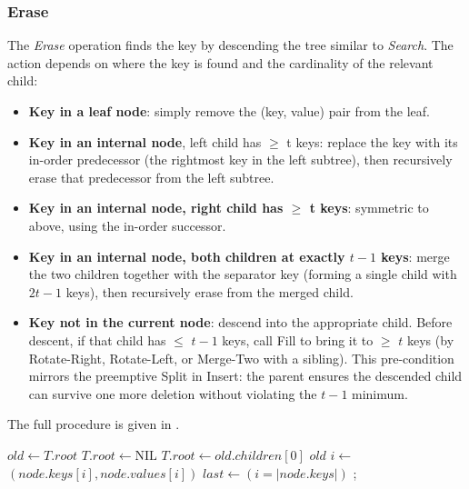 \documentclass[sigconf]{acmart}
\begin{document}
\subsubsection{Erase}
The \textit{Erase} operation finds the key by descending the tree similar to \textit{Search}. 
The action depends on where the key is found and the cardinality of the relevant child:
\begin{itemize}[noitemsep, topsep=0pt, parsep=0pt, partopsep=0pt]
    \item \textbf{Key in a leaf node}: simply remove the (key, value) pair from the leaf.
    \item \textbf{Key in an internal node}, left child has $\ge$ t keys: replace the key with its in-order predecessor (the rightmost key in the left subtree), then recursively erase that predecessor from the left subtree.
    \item \textbf{Key in an internal node, right child has $\ge$ t keys}: symmetric to above, using the in-order successor.
    \item \textbf{Key in an internal node, both children at exactly $t - 1$ keys}: merge the two children together with the separator key (forming a single child with $2t - 1$ keys), then recursively erase from the merged child.
    \item \textbf{Key not in the current node}: descend into the appropriate child. Before descent, if that child has $\le$ $t - 1$ keys, call Fill to bring it to $\ge$ $t$ keys (by Rotate-Right, Rotate-Left, or Merge-Two with a sibling). This pre-condition mirrors the preemptive Split in Insert: the parent ensures the descended child can survive one more deletion without violating the $t - 1$ minimum.
\end{itemize}
The full procedure is given in .

\begin{algorithm}[tbp]
\caption{B-Tree Erase Algorithm}
\label{alg:btree-erase}
\begin{algorithmic}[1]
     \State \Return \EndIf
    \State {}
        \State $old \gets T.root$
         \State $T.root \gets \text{NIL}$
        \Else \State $T.root \gets old.children[0]$
        \EndIf
        \State {} $old$
    \EndIf
\EndProcedure
\Statex
{}
    \State $i \gets$ 
            \State {} $(node.keys[i], node.values[i])$
        \Else
            \State {}
        \EndIf
        \State \Return
    \EndIf
     \State \Return \EndIf
    \State $last \gets (i = |node.keys|)$
        \State {}
    \EndIf
        \State {}; \Return
    \EndIf
    \State {}
\EndProcedure
\end{algorithmic}
\end{algorithm}
\end{document}
